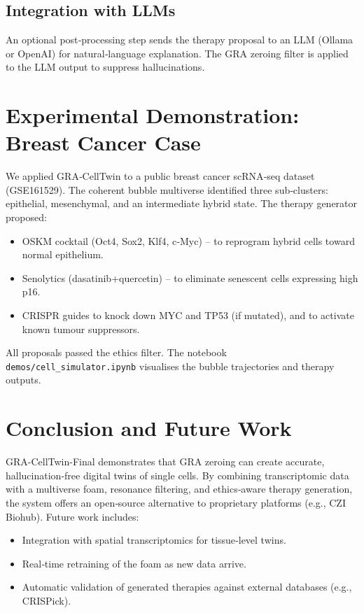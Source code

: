 \documentclass[12pt,a4paper]{article}
\begin{document}
\subsection{Integration with LLMs}
An optional post‑processing step sends the therapy proposal to an LLM (Ollama or OpenAI) for natural‑language explanation. The GRA zeroing filter is applied to the LLM output to suppress hallucinations.

\section{Experimental Demonstration: Breast Cancer Case}

We applied GRA‑CellTwin to a public breast cancer scRNA‑seq dataset (GSE161529). The coherent bubble multiverse identified three sub‑clusters: epithelial, mesenchymal, and an intermediate hybrid state. The therapy generator proposed:
\begin{itemize}
    \item OSKM cocktail (Oct4, Sox2, Klf4, c‑Myc) – to reprogram hybrid cells toward normal epithelium.
    \item Senolytics (dasatinib+quercetin) – to eliminate senescent cells expressing high p16.
    \item CRISPR guides to knock down MYC and TP53 (if mutated), and to activate known tumour suppressors.
\end{itemize}
All proposals passed the ethics filter. The notebook \texttt{demos/cell\_simulator.ipynb} visualises the bubble trajectories and therapy outputs.

\section{Conclusion and Future Work}
GRA-CellTwin-Final demonstrates that GRA zeroing can create accurate, hallucination‑free digital twins of single cells. By combining transcriptomic data with a multiverse foam, resonance filtering, and ethics‑aware therapy generation, the system offers an open‑source alternative to proprietary platforms (e.g., CZI Biohub). Future work includes:
\begin{itemize}
    \item Integration with spatial transcriptomics for tissue‑level twins.
    \item Real‑time retraining of the foam as new data arrive.
    \item Automatic validation of generated therapies against external databases (e.g., CRISPick).
\end{itemize}
\end{document}
